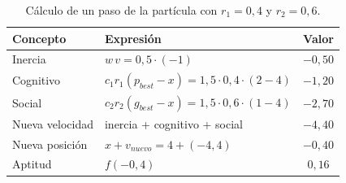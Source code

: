 \begin{table}[H]
\centering
\small
\setlength{\tabcolsep}{6pt}
\renewcommand{\arraystretch}{1.15}
\begin{tabular}{|l|l|c|}
\hline
\rowcolor{encabezado}\textbf{Concepto} & \textbf{Expresión} & \textbf{Valor} \\
\hline
Inercia & $w\,v=0{,}5\cdot(-1)$ & $-0{,}50$ \\
\hline
Cognitivo & $c_1r_1(p_{best}-x)=1{,}5\cdot0{,}4\cdot(2-4)$ & $-1{,}20$ \\
\hline
Social & $c_2r_2(g_{best}-x)=1{,}5\cdot0{,}6\cdot(1-4)$ & $-2{,}70$ \\
\hline
Nueva velocidad & inercia + cognitivo + social & $-4{,}40$ \\
\hline
Nueva posición & $x+v_{nuevo}=4+(-4{,}4)$ & $-0{,}40$ \\
\hline
Aptitud & $f(-0{,}4)$ & $0{,}16$ \\
\hline
\end{tabular}
\caption{Cálculo de un paso de la partícula con $r_1=0{,}4$ y $r_2=0{,}6$.}
\label{tab:p5a-terminos}
\end{table}
